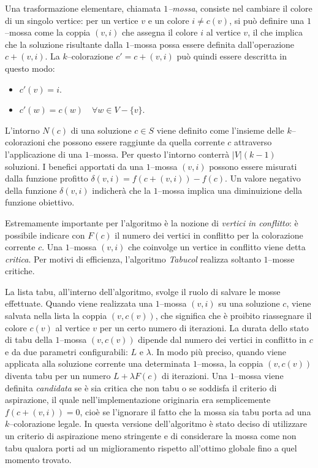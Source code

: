 \documentclass[a4paper,10pt]{article}
\newcommand{\tabucol}{\emph{Tabucol}}
\begin{document}
Una trasformazione elementare, chiamata \emph{$1$--mossa}, consiste nel cambiare il colore di un singolo vertice: per un vertice $v$ e un colore $i\neq c(v)$, si può definire una $1$--mossa come la coppia $(v,i)$ che assegna il colore $i$ al vertice $v$, il che implica che la soluzione risultante dalla $1$--mossa possa essere definita dall'operazione $c+(v,i)$. 
\pagebreak
La $k$--colorazione $c'=c+(v,i)$ può quindi essere descritta in questo modo:
\begin{itemize}
 \item $c'(v)=i$\textrm{.}
 \item $c'(w)=c(w) \quad \forall w \in V-\{v\}$\textrm{.}
\end{itemize}
L'intorno $N(c)$ di una soluzione $c\in S$ viene definito come l'insieme delle $k$--colorazioni che possono essere raggiunte da quella corrente $c$ attraverso l'applicazione di una $1$--mossa. Per questo l'intorno conterrà $|V|(k-1)$ soluzioni. I benefici apportati da una $1$--mossa $(v,i)$ possono essere misurati dalla funzione profitto $\delta(v,i)=f(c+(v,i))-f(c)$. Un valore negativo della funzione $\delta(v,i)$ indicherà che la $1$--mossa implica una diminuizione della funzione obiettivo.

Estremamente importante per l'algoritmo è la nozione di \emph{vertici in conflitto}: è possibile indicare con $F(c)$ il numero dei vertici in conflitto per la colorazione corrente $c$. Una $1$--mossa $(v,i)$ che coinvolge un vertice in conflitto viene detta \emph{critica}. Per motivi di efficienza, l'algoritmo \tabucol{} realizza soltanto $1$--mosse critiche.

La lista tabu, all'interno dell'algoritmo, svolge il ruolo di salvare le mosse effettuate. Quando viene realizzata una $1$--mossa $(v,i)$ su una soluzione $c$, viene salvata nella lista la coppia $(v,c(v))$, che significa che è proibito riassegnare il colore $c(v)$ al vertice $v$ per un certo numero di iterazioni. La durata dello stato di tabu della $1$--mossa $(v,c(v))$ dipende dal numero dei vertici in conflitto in $c$ e da due parametri configurabili: $L$ e $\lambda$. In modo più preciso, quando viene applicata alla soluzione corrente una determinata $1$--mossa, la coppia $(v,c(v))$ diventa tabu per un numero $L+ \lambda F(c)$ di iterazioni. Una $1$--mossa viene definita \emph{candidata} se è sia critica che non tabu o se soddisfa il criterio di aspirazione, il quale nell'implementazione originaria era semplicemente $f(c+(v,i))=0$, cioè se l'ignorare il fatto che la mossa sia tabu porta ad una $k$--colorazione legale. In questa versione dell'algoritmo è stato deciso di utilizzare un criterio di aspirazione meno stringente e di considerare la mossa come non tabu qualora porti ad un miglioramento rispetto all'ottimo globale fino a quel momento trovato.
\end{document}
